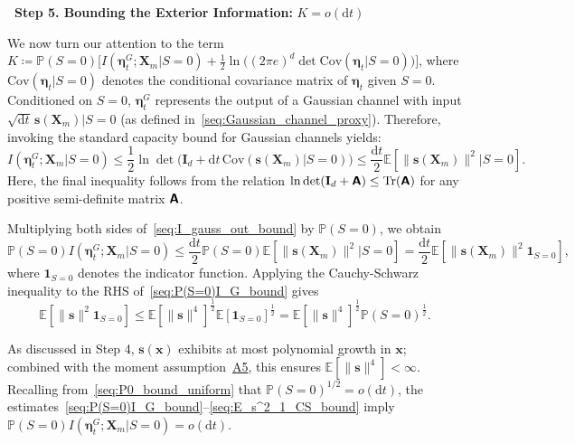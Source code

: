 \noindent\textbf{\textbullet\ Step 5. Bounding the Exterior Information:} $K=o(\mathrm dt)$

We now turn our attention to the term $K\coloneq \mathbb P(S=0)\big[I(\bm\eta_t^G;\bm X_m|S=0)+\frac{1}{2}\ln\!\big((2\pi e)^d\det\mathrm{Cov}(\bm\eta_t|S=0)\big)\big]$, where $\mathrm{Cov}(\bm\eta_t|S=0)$ denotes the conditional covariance matrix of $\bm\eta_t$ given $S=0$. Conditioned on $S=0$, $\bm\eta_t^G$ represents the output of a Gaussian channel with input $\sqrt{\mathrm dt}\,\bm s(\bm X_m)|S=0$ (as defined in~\eqref{seq:Gaussian_channel_proxy}). Therefore, invoking the standard capacity bound for Gaussian channels yields:
\begin{equation}
    I(\bm\eta_t^G;\bm X_m|S=0)
    \leq
    \frac{1}{2}\ln\det\!\big(\mathbf I_d
    +\mathrm dt\,\mathrm{Cov}(\bm s(\bm X_m)|S=0)\big)
    \leq
    \frac{\mathrm dt}{2}\mathbb E\!\left[
    \|\bm s(\bm X_m)\|^2|S=0\right].
    \label{seq:I_gauss_out_bound}
\end{equation}
Here, the final inequality follows from the relation $\ln\det(\mathbf I_d+\boldsymbol{\mathsf{A}})\leq\mathrm{Tr}(\boldsymbol{\mathsf{A}})$ for any positive semi-definite matrix $\boldsymbol{\mathsf{A}}$.

Multiplying both sides of~\eqref{seq:I_gauss_out_bound} by $\mathbb P(S=0)$, we obtain
\begin{equation}
    \mathbb P(S=0)I(\bm\eta_t^G;\bm X_m|S=0)
    \leq
    \frac{\mathrm dt}{2}\mathbb P(S=0)\mathbb E[\|\bm s(\bm X_m)\|^2|S=0]
    =\frac{\mathrm dt}{2}\mathbb E[\|\bm s(\bm X_m)\|^2\bm 1_{S=0}],
    \label{seq:P(S=0)I_G_bound}
\end{equation}
where $\bm 1_{S=0}$ denotes the indicator function. Applying the Cauchy-Schwarz inequality to the RHS of~\eqref{seq:P(S=0)I_G_bound} gives
\begin{equation}
    \mathbb E[\|\bm s\|^2\bm 1_{S=0}]\leq\mathbb E[\|\bm s\|^4]^{\frac{1}{2}}\mathbb E[\bm 1_{S=0}]^{\frac{1}{2}}
    =\mathbb E[\|\bm s\|^4]^{\frac{1}{2}}\mathbb P(S=0)^{\frac{1}{2}}.
    \label{seq:E_s^2_1_CS_bound}
\end{equation}

As discussed in Step 4, $\bm s(\bm x)$ exhibits at most polynomial growth in $\bm x$; combined with the moment assumption~\hyperlink{assumption:A5}{A5}, this ensures $\mathbb E[\|\bm s\|^4]<\infty$. Recalling from~\eqref{seq:P0_bound_uniform} that $\mathbb P(S=0)^{1/2}=o(\mathrm dt)$, the estimates~\eqref{seq:P(S=0)I_G_bound}--\eqref{seq:E_s^2_1_CS_bound} imply $\mathbb P(S=0)I(\bm\eta_t^G;\bm X_m|S=0)=o(\mathrm dt)$.

